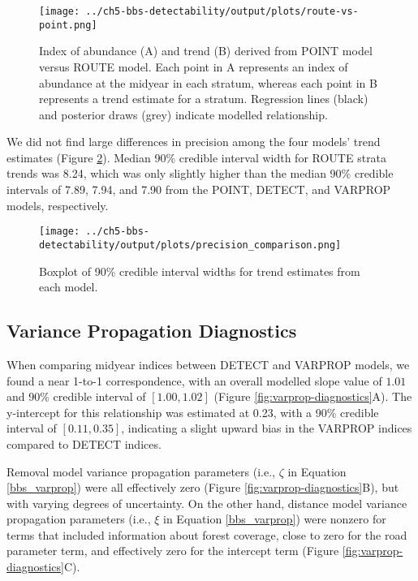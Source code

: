 \begin{figure}[h]
	\texttt{[image: ../ch5-bbs-detectability/output/plots/route-vs-point.png]}
	\caption{Index of abundance (A) and trend (B) derived from POINT model versus ROUTE model. Each point in A represents an index of abundance at the midyear in each stratum, whereas each point in B represents a trend estimate for a stratum. Regression lines (black) and posterior draws (grey) indicate modelled relationship.}
	\label{fig:route-vs-point}
\end{figure}

\par We did not find large differences in precision among the four models' trend estimates (Figure \ref{fig:precision}).
Median 90\% credible interval width for ROUTE strata trends was 8.24, which was only slightly higher than the median 90\% credible intervals of 7.89, 7.94, and 7.90 from the POINT, DETECT, and VARPROP models, respectively. 


\begin{figure}[h]
	\texttt{[image: ../ch5-bbs-detectability/output/plots/precision\_comparison.png]}
	\caption{Boxplot of 90\% credible interval widths for trend estimates from each model.}
	\label{fig:precision}
\end{figure}

\subsection{Variance Propagation Diagnostics}

\par When comparing midyear indices between DETECT and VARPROP models, we found a near 1-to-1 correspondence, with an overall modelled slope value of $1.01$ and 90\% credible interval of $[1.00, 1.02]$ (Figure \ref{fig:varprop-diagnostics}A).
The y-intercept for this relationship was estimated at 0.23, with a 90\% credible interval of $[0.11, 0.35]$, indicating a slight upward bias in the VARPROP indices compared to DETECT indices.

\par Removal model variance propagation parameters (i.e., $\zeta$ in Equation \ref{bbs_varprop}) were all effectively zero (Figure \ref{fig:varprop-diagnostics}B), but with varying degrees of uncertainty.
On the other hand, distance model variance propagation parameters (i.e., $\xi$ in Equation \ref{bbs_varprop}) were nonzero for terms that included information about forest coverage, close to zero for the road parameter term, and effectively zero for the intercept term (Figure \ref{fig:varprop-diagnostics}C).

